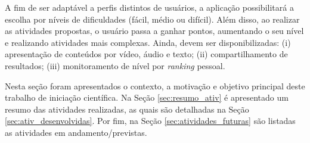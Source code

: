 A fim de ser adaptável a perfis distintos de usuários, a aplicação possibilitará a escolha por níveis de dificuldades (fácil, médio ou difícil). Além disso, ao realizar as atividades propostas, o usuário passa a ganhar pontos, aumentando o seu nível e realizando atividades mais complexas. Ainda, devem ser disponibilizadas: (i) apresentação de conteúdos por vídeo, áudio e texto; (ii) compartilhamento de resultados; (iii) monitoramento de nível por \textit{ranking} pessoal. 

Nesta seção foram apresentados o contexto, a motivação e objetivo principal deste trabalho de iniciação científica. Na Seção \ref{sec:resumo_ativ} é apresentado um resumo das atividades realizadas, as quais são detalhadas na Seção \ref{sec:ativ_desenvolvidas}. Por fim, na Seção \ref{sec:atividades_futuras} são listadas as atividades em andamento/previstas. %